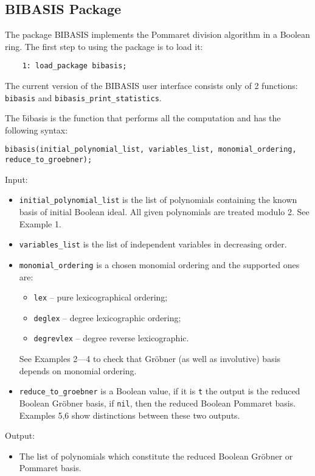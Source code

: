 \subsection{BIBASIS Package}

The package BIBASIS implements the Pommaret division algorithm in a Boolean ring. The first step to using the package
is to load it:
\begin{verbatim}
    1: load_package bibasis;
\end{verbatim}
The current version of the BIBASIS user interface consists only of 2 functions:  
\texttt{bibasis} and
\texttt{bibasis\_print\_statistics}.

\noindent The \f{bibasis} is the function that performs all the computation and has the following syntax:
\begin{center}
    \texttt{bibasis(initial\_polynomial\_list, variables\_list, monomial\_ordering, reduce\_to\_groebner);}
\end{center}
Input:
\begin{itemize}
    \item \texttt{initial\_polynomial\_list} is the list of polynomials containing the known basis of initial
Boolean ideal. All given polynomials are treated modulo 2. See Example 1.
    
    \item \texttt{variables\_list} is the list of independent variables in decreasing order.
    
    \item \texttt{monomial\_ordering} is a chosen monomial ordering and the supported ones are:
        \begin{itemize}
            \item[] \texttt{lex} -- pure lexicographical ordering;
            \item[] \texttt{deglex} -- degree lexicographic ordering;
            \item[] \texttt{degrevlex} -- degree reverse lexicographic.
        \end{itemize}
        See Examples 2---4 to check that Gr\"obner (as well as involutive) basis depends on monomial ordering.
        
    \item \texttt{reduce\_to\_groebner} is a Boolean value, if it is \texttt{t} the output is the reduced
        Boolean Gr\"obner basis, if \texttt{nil}, then the reduced Boolean Pommaret basis. Examples 5,6 show distinctions between these two outputs.
\end{itemize}
Output:
\begin{itemize}
 \item The list of polynomials which constitute the reduced Boolean Gr\"obner or Pommaret basis.
\end{itemize}

